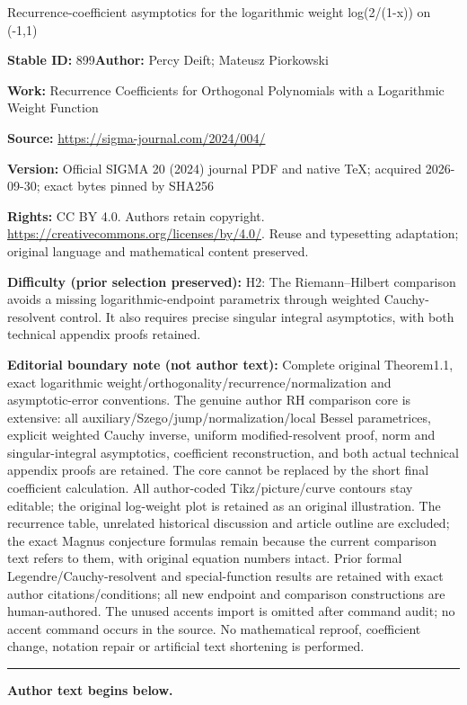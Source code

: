 \documentclass[11pt]{article}
\numberwithin{equation}{section}
\numberwithin{equation}{section}
\begin{document}
\begin{center}\Large Recurrence-coefficient asymptotics for the logarithmic weight log(2/(1-x)) on (-1,1)\end{center}
\noindent\textbf{Stable ID:} 899\quad\textbf{Author:} Percy Deift; Mateusz Piorkowski\par
\noindent\textbf{Work:} Recurrence Coefficients for Orthogonal Polynomials with a Logarithmic Weight Function\par
\noindent\textbf{Source:} \url{https://sigma-journal.com/2024/004/}\par
\noindent\textbf{Version:} Official SIGMA 20 (2024) journal PDF and native TeX; acquired 2026-09-30; exact bytes pinned by SHA256\par
\noindent\textbf{Rights:} CC BY 4.0. Authors retain copyright. \url{https://creativecommons.org/licenses/by/4.0/}. Reuse and typesetting adaptation; original language and mathematical content preserved.\par
\noindent\textbf{Difficulty (prior selection preserved):} {\CJKfont H2: The Riemann–Hilbert comparison avoids a missing logarithmic-endpoint parametrix through weighted Cauchy-resolvent control. It also requires precise singular integral asymptotics, with both technical appendix proofs retained.}\par
\medskip\noindent\textbf{Editorial boundary note (not author text):} Complete original Theorem1.1, exact logarithmic weight/orthogonality/recurrence/normalization and asymptotic-error conventions. The genuine author RH comparison core is extensive: all auxiliary/Szego/jump/normalization/local Bessel parametrices, explicit weighted Cauchy inverse, uniform modified-resolvent proof, norm and singular-integral asymptotics, coefficient reconstruction, and both actual technical appendix proofs are retained. The core cannot be replaced by the short final coefficient calculation. All author-coded Tikz/picture/curve contours stay editable; the original log-weight plot is retained as an original illustration. The recurrence table, unrelated historical discussion and article outline are excluded; the exact Magnus conjecture formulas remain because the current comparison text refers to them, with original equation numbers intact. Prior formal Legendre/Cauchy-resolvent and special-function results are retained with exact author citations/conditions; all new endpoint and comparison constructions are human-authored. The unused accents import is omitted after command audit; no accent command occurs in the source. No mathematical reproof, coefficient change, notation repair or artificial text shortening is performed.\par
\medskip\hrule\medskip\noindent\textbf{Author text begins below.}\par
\end{document}
